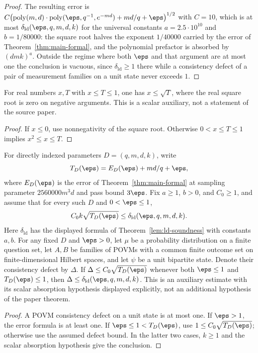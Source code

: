\begin{proof}
	The resulting error is $C\bigl(\mathrm{poly}(m,d) \cdot \mathrm{poly}(\eps, q^{-1}, e^{-md}) + md/q + \eps\bigr)^{1/2}$ with $C=10$, which is at most $\delta_{\mathrm{ld}}(\eps,q,m,d,k)$ for the universal constants $a = 2.5 \cdot 10^{10}$ and $b = 1/80000$: the square root halves the exponent $1/40000$ carried by the error of Theorem~\ref{thm:main-formal}, and the polynomial prefactor is absorbed by $(dmk)^a$. Outside the regime where both $\eps$ and that argument are at most one the conclusion is vacuous, since $\delta_{\mathrm{ld}} \ge 1$ there while a consistency defect of a pair of measurement families on a unit state never exceeds $1$.
\end{proof}

\begin{theorem}
\label{lem:ld-scalar-square-root}
\leanok
For real numbers $x,T$ with $x\le T\le1$, one has $x\le\sqrt T$,
where the real square root is zero on negative arguments.
This is a scalar auxiliary, not a statement of the source paper.
\end{theorem}
\begin{proof}
\leanok
If $x\le0$, use nonnegativity of the square root. Otherwise
$0<x\le T\le1$ implies $x^2\le x\le T$.
\end{proof}

\begin{theorem}
\label{lem:ld-transport-absorption}
\leanok
{}
For directly indexed parameters $D=(q,m,d,k)$, write
\[
 T_D(\eps)=E_D(\eps)+md/q+\eps,
\]
where $E_D(\eps)$ is the error of Theorem~\ref{thm:main-formal} at
sampling parameter $2560000m^3d$ and pass bound $3\eps$.
Fix $a\ge1$, $b>0$, and $C_0\ge1$, and assume that for every such $D$
and $0<\eps\le1$,
\[
 C_0 k\sqrt{T_D(\eps)}\le
 \delta_{\mathrm{ld}}(\eps,q,m,d,k).
\]
Here $\delta_{\mathrm{ld}}$ has the displayed formula of
Theorem~\ref{lem:ld-soundness} with constants $a,b$.
For any fixed $D$ and $\eps>0$, let $\mu$ be a probability distribution
on a finite question set, let $A,B$ be families of POVMs with a common
finite outcome set on finite-dimensional Hilbert spaces, and let $\psi$
be a unit bipartite state. Denote their consistency defect by $\Delta$.
If $\Delta\le C_0\sqrt{T_D(\eps)}$ whenever both $\eps\le1$ and
$T_D(\eps)\le1$, then
$\Delta\le\delta_{\mathrm{ld}}(\eps,q,m,d,k)$.
This is an auxiliary estimate with its scalar absorption hypothesis
displayed explicitly, not an additional hypothesis of the paper theorem.
\end{theorem}
\begin{proof}
\leanok
A POVM consistency defect on a unit state is at most one. If $\eps>1$,
the error formula is at least one. If $\eps\le1<T_D(\eps)$, use
$1\le C_0\sqrt{T_D(\eps)}$; otherwise use the assumed defect bound.
In the latter two cases, $k\ge1$ and the scalar absorption hypothesis
give the conclusion.
\end{proof}

